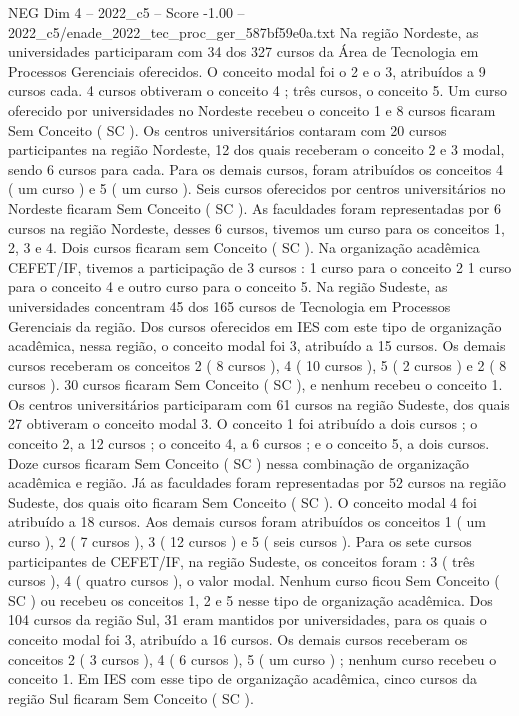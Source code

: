 \begin{textsample}{NEG Dim 4 – 2022\_c5 – Score -1.00 – 2022\_c5/enade\_2022\_tec\_proc\_ger\_587bf59e0a.txt}
Na região Nordeste, as universidades participaram com 34 dos 327 cursos da Área de Tecnologia em Processos Gerenciais oferecidos.
O conceito modal foi o 2 e o 3, atribuídos a 9 cursos cada. 4 cursos obtiveram o conceito 4 ; três cursos, o conceito 5.
Um curso oferecido por universidades no Nordeste recebeu o conceito 1 e 8 cursos ficaram Sem Conceito ( SC ).
Os centros universitários contaram com 20 cursos participantes na região Nordeste, 12 dos quais receberam o conceito 2 e 3 modal, sendo 6 cursos para cada.
Para os demais cursos, foram atribuídos os conceitos 4 ( um curso ) e 5 ( um curso ).
Seis cursos oferecidos por centros universitários no Nordeste ficaram Sem Conceito ( SC ).
As faculdades foram representadas por 6 cursos na região Nordeste, desses 6 cursos, tivemos um curso para os conceitos 1, 2, 3 e 4.
Dois cursos ficaram sem Conceito ( SC ).
Na organização acadêmica CEFET/IF, tivemos a participação de 3 cursos : 1 curso para o conceito 2 1 curso para o conceito 4 e outro curso para o conceito 5.
Na região Sudeste, as universidades concentram 45 dos 165 cursos de Tecnologia em Processos Gerenciais da região.
Dos cursos oferecidos em IES com este tipo de organização acadêmica, nessa região, o conceito modal foi 3, atribuído a 15 cursos.
Os demais cursos receberam os conceitos 2 ( 8 cursos ), 4 ( 10 cursos ), 5 ( 2 cursos ) e 2 ( 8 cursos ). 30 cursos ficaram Sem Conceito ( SC ), e nenhum recebeu o conceito 1.
Os centros universitários participaram com 61 cursos na região Sudeste, dos quais 27 obtiveram o conceito modal 3.
O conceito 1 foi atribuído a dois cursos ; o conceito 2, a 12 cursos ; o conceito 4, a 6 cursos ; e o conceito 5, a dois cursos.
Doze cursos ficaram Sem Conceito ( SC ) nessa combinação de organização acadêmica e região.
Já as faculdades foram representadas por 52 cursos na região Sudeste, dos quais oito ficaram Sem Conceito ( SC ).
O conceito modal 4 foi atribuído a 18 cursos.
Aos demais cursos foram atribuídos os conceitos 1 ( um curso ), 2 ( 7 cursos ), 3 ( 12 cursos ) e 5 ( seis cursos ).
Para os sete cursos participantes de CEFET/IF, na região Sudeste, os conceitos foram : 3 ( três cursos ), 4 ( quatro cursos ), o valor modal.
Nenhum curso ficou Sem Conceito ( SC ) ou recebeu os conceitos 1, 2 e 5 nesse tipo de organização acadêmica.
Dos 104 cursos da região Sul, 31 eram mantidos por universidades, para os quais o conceito modal foi 3, atribuído a 16 cursos.
Os demais cursos receberam os conceitos 2 ( 3 cursos ), 4 ( 6 cursos ), 5 ( um curso ) ; nenhum curso recebeu o conceito 1.
Em IES com esse tipo de organização acadêmica, cinco cursos da região Sul ficaram Sem Conceito ( SC ).

\end{textsample}
